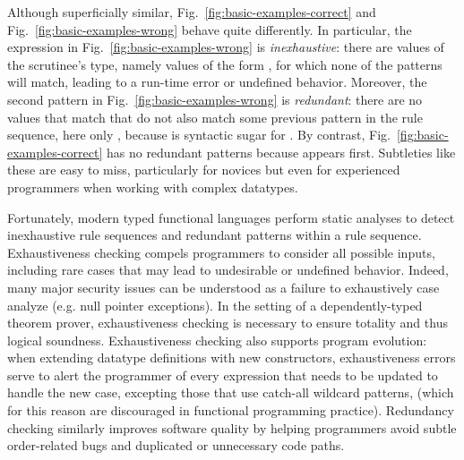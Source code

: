 Although superficially similar, Fig.~\ref{fig:basic-examples-correct} and Fig.~\ref{fig:basic-examples-wrong}
behave quite differently. In particular, the  expression in Fig.~\ref{fig:basic-examples-wrong} is \emph{inexhaustive}: there are values of the scrutinee's type, namely values of the form , for which none of the patterns will match, leading to a run-time error or undefined behavior. 
Moreover, the second pattern in Fig.~\ref{fig:basic-examples-wrong} is \emph{redundant}: there are no values that match  that do not also match some
previous pattern in the rule sequence, here only , because \li{[x, y]} is syntactic sugar for .
By contrast, Fig.~\ref{fig:basic-examples-correct} has no redundant patterns because  appears first.
Subtleties like these are easy to miss, particularly for novices but even for experienced programmers when working with complex datatypes.

Fortunately,
modern typed functional languages perform static analyses to detect inexhaustive rule sequences and redundant patterns within a rule sequence.
Exhaustiveness checking compels programmers to consider all possible inputs, including rare cases that may lead to undesirable or undefined behavior. Indeed, many major security issues can be understood as a failure to exhaustively case analyze (e.g. null pointer exceptions).
In the setting of a dependently-typed theorem prover, exhaustiveness checking is necessary to ensure totality and thus logical soundness.
Exhaustiveness checking also supports program evolution: when extending datatype definitions with new constructors, exhaustiveness errors 
serve to alert the programmer of every  expression that needs to be updated to handle the new case, excepting those that use catch-all wildcard patterns, \li{_} (which for this reason are discouraged in functional programming practice).
Redundancy checking similarly improves software quality by helping programmers avoid subtle order-related bugs and duplicated or unnecessary code paths.



